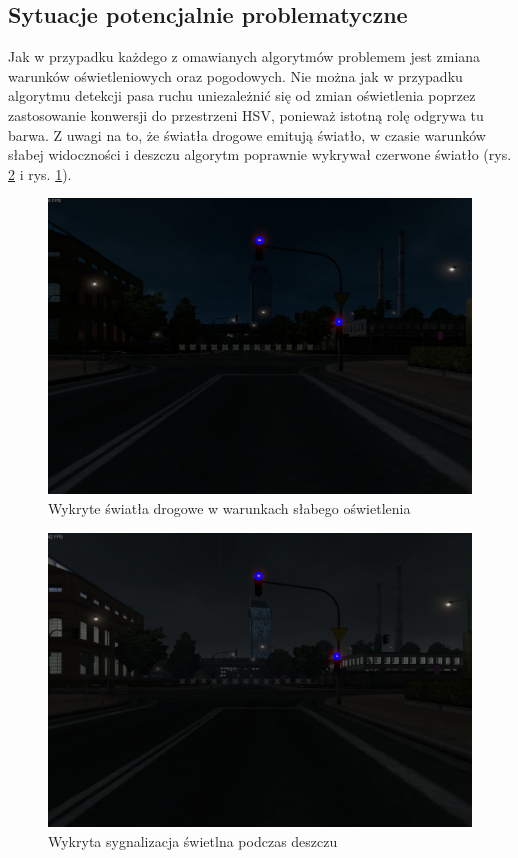 \subsection{Sytuacje potencjalnie problematyczne}
Jak w przypadku każdego z omawianych algorytmów problemem jest zmiana warunków oświetleniowych oraz pogodowych. 
Nie można jak w przypadku algorytmu detekcji pasa ruchu uniezależnić się od zmian oświetlenia poprzez zastosowanie konwersji do przestrzeni HSV, ponieważ istotną rolę odgrywa tu barwa. %
Z uwagi na to, że światła drogowe emitują światło, w czasie warunków słabej widoczności i deszczu algorytm poprawnie wykrywał czerwone światło (rys. \ref{fig:alg2_rain} i rys. \ref{fig:alg2_late}).

\begin{figure}
  \centering
  \includegraphics[width=13cm]{img/alg2_late.jpg}
  \caption{Wykryte światła drogowe w warunkach słabego oświetlenia}
  \label{fig:alg2_late}
\end{figure}

\begin{figure}
  \centering
  \includegraphics[width=13cm]{img/alg2_rain.jpg}
  \caption{Wykryta sygnalizacja świetlna podczas deszczu} %
  \label{fig:alg2_rain}
\end{figure}

